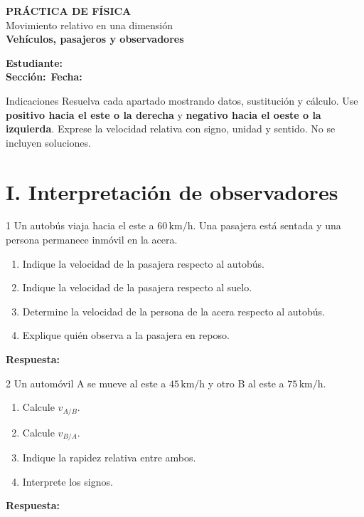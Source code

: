 \documentclass[11pt,letterpaper]{article}
\newcommand{\espacio}[1]{\par\vspace{#1}\par}
\newcommand{\renglon}{\par\textcolor{morado}{\bfseries Respuesta:}\ \dotfill\par}
\begin{document}
\begin{center}{\LARGE\bfseries\color{azul} PRÁCTICA DE FÍSICA}\\[3pt]
{\Large Movimiento relativo en una dimensión}\\[4pt]
{\color{verde}\bfseries Vehículos, pasajeros y observadores}\end{center}
\begin{tcolorbox}[colback=blue!3,colframe=azul,arc=2mm]
\textbf{Estudiante:}\ \hrulefill\\[8pt]
\textbf{Sección:}\ \underline{\hspace{3cm}}\hfill\textbf{Fecha:}\ \underline{\hspace{3.5cm}}
\end{tcolorbox}
\begin{bloque}{Indicaciones}
Resuelva cada apartado mostrando datos, sustitución y cálculo. Use \textbf{positivo hacia el este o la derecha} y \textbf{negativo hacia el oeste o la izquierda}. Exprese la velocidad relativa con signo, unidad y sentido. No se incluyen soluciones.
\end{bloque}
\section*{I. Interpretación de observadores}
\begin{problema}{1}
Un autobús viaja hacia el este a $60\,\mathrm{km/h}$. Una pasajera está sentada y una persona permanece inmóvil en la acera.
\begin{enumerate}[label=\alph*)]
\item Indique la velocidad de la pasajera respecto al autobús.
\item Indique la velocidad de la pasajera respecto al suelo.
\item Determine la velocidad de la persona de la acera respecto al autobús.
\item Explique quién observa a la pasajera en reposo.
\end{enumerate}
\espacio{3cm}\renglon
\end{problema}
\newpage
\begin{problema}{2}
Un automóvil A se mueve al este a $45\,\mathrm{km/h}$ y otro B al este a $75\,\mathrm{km/h}$.
\begin{enumerate}[label=\alph*)]\item Calcule $v_{A/B}$.\item Calcule $v_{B/A}$.\item Indique la rapidez relativa entre ambos.\item Interprete los signos.\end{enumerate}
\espacio{3cm}\renglon
\end{problema}
\clearpage
\end{document}
